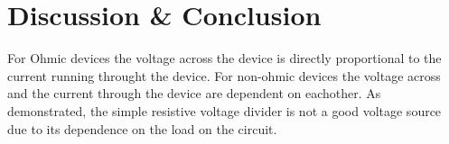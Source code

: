 \documentclass[11pt,onecolumn]{article}
\begin{document}
\section{Discussion \& Conclusion}
For Ohmic devices the voltage across the device is directly proportional to the current running throught the device. For non-ohmic devices the voltage across and the current through the device are dependent on eachother. As demonstrated, the simple resistive voltage divider is not a good voltage source due to its dependence on the load on the circuit.

\end{document}
